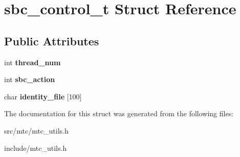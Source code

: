 \hypertarget{structsbc__control__t}{
\section{sbc\_\-control\_\-t Struct Reference}
\label{structsbc__control__t}
}
\subsection*{Public Attributes}
\begin{DoxyCompactItemize}
\item 
\hypertarget{structsbc__control__t_a0f34fb80dba503f04eed434e140d9ef1}{
int {\bfseries thread\_\-num}}
\label{structsbc__control__t_a0f34fb80dba503f04eed434e140d9ef1}

\item 
\hypertarget{structsbc__control__t_a390d6accd57cca9dbc12e056db5e344f}{
int {\bfseries sbc\_\-action}}
\label{structsbc__control__t_a390d6accd57cca9dbc12e056db5e344f}

\item 
\hypertarget{structsbc__control__t_aa53a24d4a0fb619c73f7b552e2f6f604}{
char {\bfseries identity\_\-file} \mbox{[}100\mbox{]}}
\label{structsbc__control__t_aa53a24d4a0fb619c73f7b552e2f6f604}

\end{DoxyCompactItemize}


The documentation for this struct was generated from the following files:\begin{DoxyCompactItemize}
\item 
src/mtc/mtc\_\-utils.h\item 
include/mtc\_\-utils.h\end{DoxyCompactItemize}
